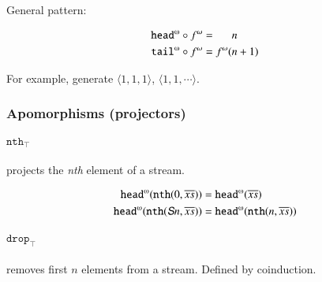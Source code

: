 General pattern:

\begin{alignat}{2}
  \cohead\circ\Lift{f}{\omega} &= \phantom{\Lift{f}{\omega}(}n \\
  \cotail\circ\Lift{f}{\omega} &= \Lift{f}{\omega}(n+1)
\end{alignat}


For example, generate \(\langle 1,1,1\rangle\), \(\langle 1,1,\cdots\rangle\).

\subsubsection{Apomorphisms (projectors)}

\paragraph{\(\texttt{nth}_{\scriptscriptstyle\top}\)}
projects the \textit{nth} element of a stream.

\begin{prooftree}
\end{prooftree}

\begin{align} %
  \cohead(\texttt{nth}(0,\coseq{x})) &= \cohead(\coseq{x}) \\
  \cohead(\texttt{nth}(\SNat{}n,\coseq{x})) &= \cohead(\texttt{nth}(n,\coseq{x}))
\end{align} %

\paragraph{\(\texttt{drop}_{\scriptscriptstyle\top}\)}
removes first \(n\) elements from a stream. Defined by coinduction.

\begin{prooftree}
\end{prooftree}



